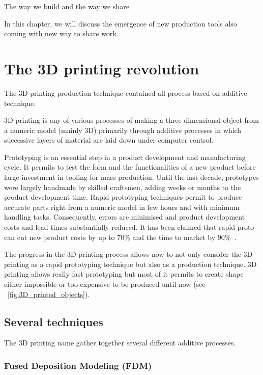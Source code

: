 The way we build and the way we share

In this chapter, we will discuss the emergence of new production tools also coming with new way to share work.

\section{The 3D printing revolution} %

The 3D printing production technique contained all process based on additive technique.

3D printing is any of various processes of making a three-dimensional object from a numeric model (mainly 3D) primarily through additive processes in which successive layers of material are laid down under computer control.


Prototyping is an essential step in a product development and manufacturing cycle. It permits to test the form and the functionalities of a new product before large investment in tooling for mass production. Until the last decade, prototypes were largely handmade by skilled craftsmen, adding weeks or months to the product development time. Rapid prototyping techniques permit to produce accurate parts right from a numeric model in few hours and with minimum handling tasks. Consequently, errors are minimised and product development costs and lead times substantially reduced. It has been claimed that rapid proto can cut new product costs by up to 70\% and the time to market by 90\%~\cite{waterman1994rapid}.

The progress in the 3D printing process allows now to not only consider the 3D printing as a rapid prototyping technique but also as a production technique. 3D printing allows really fast prototyping but most of it permits to create shape either impossible or too expensive to be produced until now (see \figurename~\ref{fig:3D_printed_objects}).



\subsection{Several techniques} %

The 3D printing name gather together several different additive processes.

\subsubsection{Fused Deposition Modeling (FDM)} %

